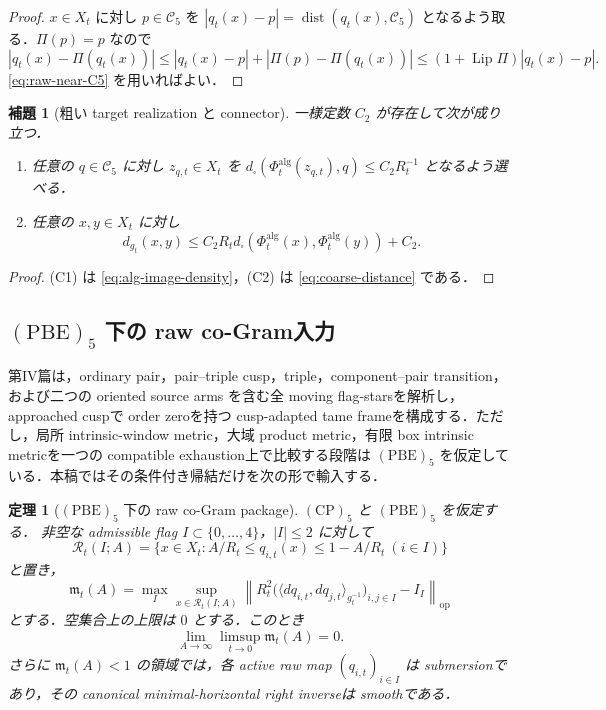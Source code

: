 \documentclass[a4paper,11pt]{ltjsarticle}
\numberwithin{equation}{section}
\theoremstyle{plain}
\newtheorem{theorem}{定理}[section]
\newtheorem{lemma}[lemma]{補題}
\theoremstyle{definition}
\theoremstyle{remark}
\newcommand{\cC}{\mathcal C}
\newcommand{\dist}{\operatorname{dist}}
\newcommand{\Lip}{\operatorname{Lip}}
\begin{document}
\begin{proof}
$x\in X_t$ に対し $p\in\cC_5$ を $|q_t(x)-p|=\dist(q_t(x),\cC_5)$ となるよう取る．$\Pi(p)=p$ なので
\[
 |q_t(x)-\Pi(q_t(x))|
 \le |q_t(x)-p|+|\Pi(p)-\Pi(q_t(x))|
 \le(1+\Lip\Pi)|q_t(x)-p|.
\]
\eqref{eq:raw-near-C5} を用いればよい．
\end{proof}

\begin{lemma}[粗い target realization と connector]\label{lem:coarse-realization}
一様定数 $C_2$ が存在して次が成り立つ．
\begin{enumerate}[label=\textup{(C\arabic*)}]
\item 任意の $q\in\cC_5$ に対し $z_{q,t}\in X_t$ を
      $d_\square(\Phi_t^{\mathrm{alg}}(z_{q,t}),q)\le C_2R_t^{-1}$ となるよう選べる．
\item 任意の $x,y\in X_t$ に対し
      \[
       d_{g_t}(x,y)\le C_2R_t d_\square(\Phi_t^{\mathrm{alg}}(x),\Phi_t^{\mathrm{alg}}(y))+C_2.
      \]
\end{enumerate}
\end{lemma}

\begin{proof}
(C1) は \eqref{eq:alg-image-density}，(C2) は \eqref{eq:coarse-distance} である．
\end{proof}

\subsection{$\mathrm{(PBE)}_5$ 下の raw co-Gram入力}

第IV篇は，ordinary pair，pair--triple cusp，triple，component--pair transition，および二つの oriented source arms を含む全 moving flag-starsを解析し，approached cuspで order zeroを持つ cusp-adapted tame frameを構成する．ただし，局所 intrinsic-window metric，大域 product metric，有限 box intrinsic metricを一つの compatible exhaustion上で比較する段階は $\mathrm{(PBE)}_5$ を仮定している．本稿ではその条件付き帰結だけを次の形で輸入する．

\begin{theorem}[$\mathrm{(PBE)}_5$ 下の raw co-Gram package]\label{thm:partII-package}
$\mathrm{(CP)}_5$ と $\mathrm{(PBE)}_5$ を仮定する．
非空な admissible flag $I\subset\{0,\ldots,4\}$，$|I|\le2$ に対して
\[
 \mathcal R_t(I;A)=
 \{x\in X_t:A/R_t\le q_{i,t}(x)\le1-A/R_t\ (i\in I)\}
\]
と置き，
\begin{equation}\label{eq:partII-modulus-input}
 \mathfrak m_t(A)=
 \max_I\sup_{x\in\mathcal R_t(I;A)}
 \left\|
 R_t^2\bigl(\langle dq_{i,t},dq_{j,t}\rangle_{g_t^{-1}}\bigr)_{i,j\in I}
 -I_I
 \right\|_{\mathrm{op}}
\end{equation}
とする．空集合上の上限は $0$ とする．このとき
\begin{equation}\label{eq:partII-modulus-limit}
 \boxed{\displaystyle
 \lim_{A\to\infty}\limsup_{t\to0}\mathfrak m_t(A)=0.}
\end{equation}
さらに $\mathfrak m_t(A)<1$ の領域では，各 active raw map
$(q_{i,t})_{i\in I}$ は submersionであり，その canonical minimal-horizontal right inverseは smoothである．
\end{theorem}
\end{document}
